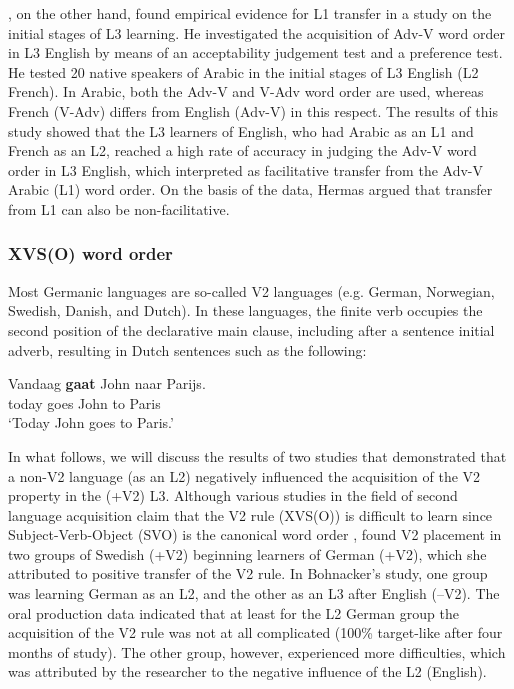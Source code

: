 \documentclass[output=paper,modfonts,nonflat, newtxmath]{langsci/langscibook}
\begin{document}
  \citet{Hermas2010}, on the other hand, found empirical evidence for L1 transfer in a study on the initial stages of L3 learning. He investigated the acquisition of Adv-V word order in L3 English by means of an acceptability judgement test and a preference test. He tested 20 native speakers of Arabic in the initial stages of L3 English (L2 French). In Arabic, both the Adv-V and V-Adv word order are used, whereas French (V-Adv) differs from English (Adv-V) in this respect. The results of this study showed that the L3 learners of English, who had Arabic as an L1 and French as an L2, reached a high rate of accuracy in judging the Adv-V word order in L3 English, which \citet{Hermas2010} interpreted as facilitative transfer from the Adv-V Arabic (L1) word order. On the basis of the data, Hermas argued that transfer from L1 can also be non-facilitative.

\subsubsection{{XVS(O)} {word} {order}}

Most Germanic languages are so-called V2 languages (e.g. German, Norwegian, Swedish, Danish, and Dutch). In these languages, the finite verb occupies the second position of the declarative main clause, including after a sentence initial adverb, resulting in Dutch sentences such as the following:

\ea%
\label{ex:stadt:1}
\gll Vandaag \textbf{gaat} John naar Parijs.\\
today goes John to Paris\\
\glt ‘Today John goes to Paris.’
\z


In what follows, we will discuss the results of two studies that demonstrated that a non-V2 language (as an L2) negatively influenced the acquisition of the V2 property in the (+V2) L3. Although various studies in the field of second language acquisition claim that the V2 rule (XVS(O)) is difficult to learn since Subject-Verb-Object (SVO) is the canonical word order \citep{KleinPerdue1997, Pienemann1998, WahlstromMcKay2001, Bohnacker2006}, \citet{Bohnacker2006} found V2 placement in two groups of Swedish (+V2) beginning learners of German (+V2), which she attributed to positive transfer of the V2 rule. In Bohnacker’s study, one group was learning German as an L2, and the other as an L3 after English (–V2). The oral production data indicated that at least for the L2 German group the acquisition of the V2 rule was not at all complicated (100\% target-like after four months of study). The other group, however, experienced more difficulties, which was attributed by the researcher to the negative influence of the L2 (English).
\end{document}
